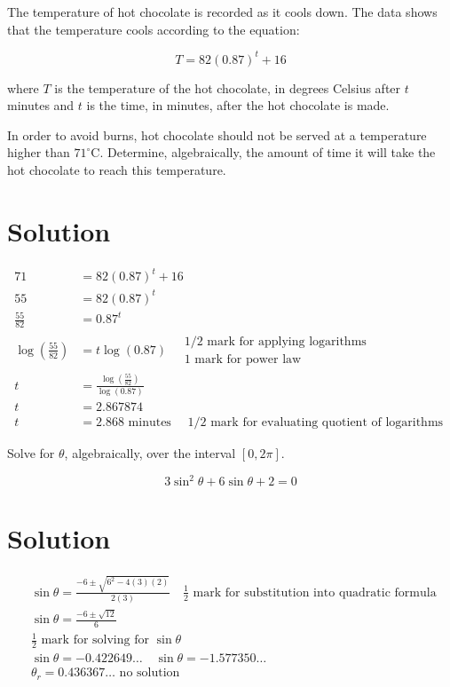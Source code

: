 \documentclass[10pt]{article}
\begin{document}
The temperature of hot chocolate is recorded as it cools down. The data shows that the temperature cools according to the equation:

$$
T=82(0.87)^{t}+16
$$

where $T$ is the temperature of the hot chocolate, in degrees Celsius after $t$ minutes and $t$ is the time, in minutes, after the hot chocolate is made.

In order to avoid burns, hot chocolate should not be served at a temperature higher than $71^{\circ} \mathrm{C}$. Determine, algebraically, the amount of time it will take the hot chocolate to reach this temperature.

\section*{Solution}
$$
\begin{aligned}
71 & =82(0.87)^{t}+16 \\
55 & =82(0.87)^{t} \\
\frac{55}{82} & =0.87^{t} \\
\log \left(\frac{55}{82}\right) & =t \log (0.87) \quad \begin{array}{l}
1 / 2 \text { mark for applying logarithms } \\
1 \text { mark for power law }
\end{array} \\
t & =\frac{\log \left(\frac{55}{82}\right)}{\log (0.87)} \\
t & =2.867874 \\
t & =2.868 \text { minutes } \quad 1 / 2 \text { mark for evaluating quotient of logarithms }
\end{aligned}
$$

Solve for $\theta$, algebraically, over the interval $[0,2 \pi]$.

$$
3 \sin ^{2} \theta+6 \sin \theta+2=0
$$

\section*{Solution}
$$
\begin{aligned}
& \sin \theta=\frac{-6 \pm \sqrt{6^{2}-4(3)(2)}}{2(3)} \quad \frac{1}{2} \text { mark for substitution into quadratic formula } \\
& \sin \theta=\frac{-6 \pm \sqrt{12}}{6} \\
& \frac{1}{2} \text { mark for solving for } \sin \theta \\
& \sin \theta=-0.422649 \ldots \quad \sin \theta=-1.577350 \ldots \\
& \theta_{r}=0.436367 \ldots \text { no solution }
\end{aligned}
$$
\end{document}
